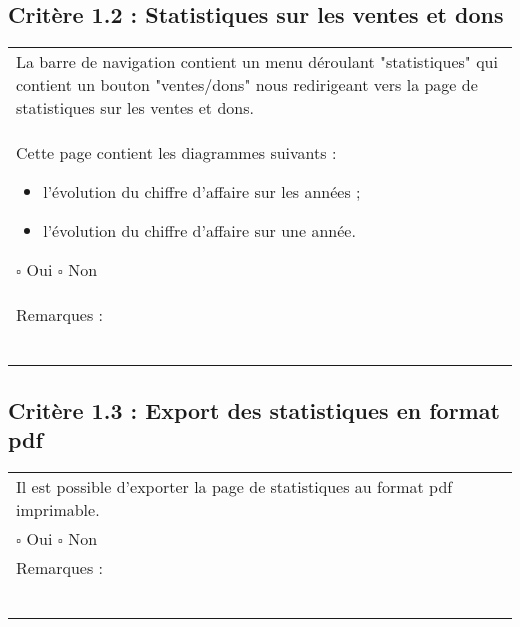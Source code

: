 	\subsection*{Critère 1.2 : Statistiques sur les ventes et dons}
	
		\begin{center}
    	 		\begin{tabular}[h]{|p{}|}
			\hline La barre de navigation contient un menu déroulant "statistiques" qui contient un bouton "ventes/dons" nous redirigeant vers la page de statistiques sur les ventes et dons.\\
Cette page contient les diagrammes suivants :
		\begin{itemize}
			\item l'évolution du chiffre d'affaire sur les années ;
			\item l'évolution du chiffre d'affaire sur une année.
		\end{itemize}
				
				$\square$ Oui \hfill \hfill $\square$ Non \\\hline Remarques : \\ ~\\
			 \\\hline
     		\end{tabular}
  		\end{center}	
  		
  	\subsection*{Critère 1.3 : Export des statistiques en format pdf}
	
		\begin{center}
    	 		\begin{tabular}[h]{|p{}|}
			\hline Il est possible d'exporter la page de statistiques au format pdf imprimable.
			\\
				
				$\square$ Oui \hfill \hfill $\square$ Non \\\hline Remarques : \\ ~\\
			 \\\hline
     		\end{tabular}
  		\end{center}	
